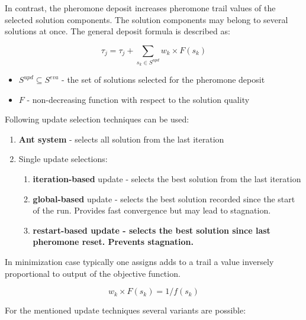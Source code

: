 In contrast, the pheromone deposit increases pheromone trail values of the selected solution components. The solution components may belong to several solutions at once. The general deposit formula is described as:

\begin{equation}
\tau_j = \tau_j + \sum \limits_{s_k \in S^{upd}} w_k \times F(s_k)
\end{equation} 

\begin{itemize}
\item $S^{upd} \subseteq S^{eva}$ - the set of solutions selected for the pheromone deposit
\item $F$ - non-decreasing function with respect to the solution quality
\end{itemize}

Following update selection techniques can be used:
\begin{enumerate}
\item {\textbf{Ant system} - selects all solution from the last iteration}
\item {Single update selections:}
\begin{enumerate}
\item {\textbf{iteration-based} update - selects the best solution from the last iteration}
\item {\textbf{global-based} update - selects the best solution recorded since the start of the run. Provides fast convergence but may lead to stagnation.}
\item \textbf{{restart-based} update - selects the best solution since last pheromone reset. Prevents stagnation.}
\end{enumerate}
\end{enumerate}

In minimization case typically one assigns adds to a trail a value inversely proportional to output of the objective function.

\begin{equation}
w_k \times F(s_k) = 1 / f(s_k)
\end{equation}

For the mentioned update techniques several variants are possible: \\

